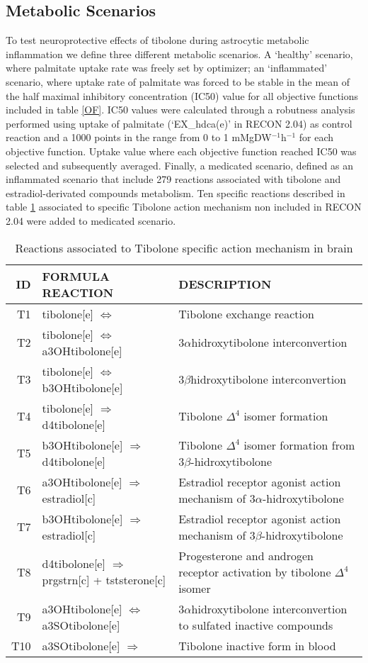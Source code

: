 \subsection{Metabolic Scenarios}
To test neuroprotective effects of tibolone during astrocytic metabolic inflammation we define three different metabolic scenarios. A `healthy' scenario, where palmitate uptake rate was freely set by optimizer; an `inflammated' scenario, where uptake rate of palmitate was forced to be stable in the mean of the half maximal inhibitory concentration (IC50) value for all objective functions included in table \ref{OF}. IC50 values were calculated through a robutness analysis performed using uptake of palmitate (`EX\_hdca(e)' in RECON 2.04) as control reaction and a 1000 points in the range from 0 to 1 mMgDW$^{-1}$h$^{-1}$ for each objective function. Uptake value where each objective function reached IC50 was selected and subsequently averaged. Finally, a medicated scenario, defined as an inflammated scenario that include 279 reactions associated with tibolone and estradiol-derivated compounds metabolism. Ten specific reactions described in table \ref{Tibolone} associated to specific Tibolone action mechanism non included in RECON 2.04 were added to medicated scenario.
\begin{table}[h]
\caption{Reactions associated to Tibolone specific action mechanism in brain \cite{Kloosterboer2004}}
\label{Tibolone}
\begin{center}
\begin{tabular}{rlm{7cm}}
\hline
ID & FORMULA REACTION & DESCRIPTION \\
\hline
\hline
T1 & tibolone[e] $\Leftrightarrow$ & Tibolone exchange reaction\\
T2 & tibolone[e] $\Leftrightarrow$ a3OHtibolone[e] & 3$\alpha$hidroxytibolone interconvertion\\
T3 & tibolone[e] $\Leftrightarrow$ b3OHtibolone[e] & 3$\beta$hidroxytibolone interconvertion \\
T4 & tibolone[e] $\Rightarrow$ d4tibolone[e] & Tibolone $\Delta^4$ isomer formation \\
T5 & b3OHtibolone[e] $\Rightarrow$ d4tibolone[e] &  Tibolone $\Delta^4$ isomer formation from 3$\beta$-hidroxytibolone \\
T6 & a3OHtibolone[e] $\Rightarrow$ estradiol[c] & Estradiol receptor agonist action mechanism of 3$\alpha$-hidroxytibolone\\
T7 & b3OHtibolone[e] $\Rightarrow$ estradiol[c] & Estradiol receptor agonist action mechanism of 3$\beta$-hidroxytibolone\\
T8 & d4tibolone[e] $\Rightarrow$ prgstrn[c] + tststerone[c] & Progesterone and androgen receptor activation by tibolone $\Delta^4$ isomer\\
T9 & a3OHtibolone[e] $\Leftrightarrow$ a3SOtibolone[e] & 3$\alpha$hidroxytibolone interconvertion to sulfated inactive compounds \\
T10 & a3SOtibolone[e] $\Rightarrow$ & Tibolone inactive form in blood \\ 
\hline
\end{tabular}
\end{center}
\end{table} 
\vspace*{-1cm}
